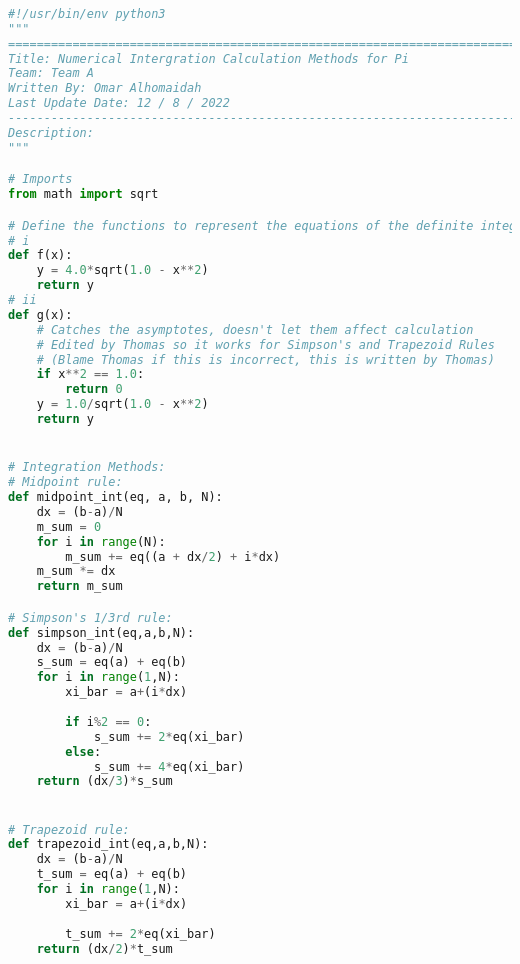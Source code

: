 \documentclass[11pt]{article}
\begin{document}
\begin{lstlisting}[language=Python]
	
#!/usr/bin/env python3
"""
===============================================================================
Title: Numerical Intergration Calculation Methods for Pi
Team: Team A
Written By: Omar Alhomaidah
Last Update Date: 12 / 8 / 2022
-------------------------------------------------------------------------------
Description:
"""

# Imports
from math import sqrt

# Define the functions to represent the equations of the definite integrals
# i
def f(x):
    y = 4.0*sqrt(1.0 - x**2)
    return y
# ii
def g(x):
    # Catches the asymptotes, doesn't let them affect calculation
    # Edited by Thomas so it works for Simpson's and Trapezoid Rules
    # (Blame Thomas if this is incorrect, this is written by Thomas)
    if x**2 == 1.0:
        return 0
    y = 1.0/sqrt(1.0 - x**2)
    return y


# Integration Methods:
# Midpoint rule:
def midpoint_int(eq, a, b, N):
    dx = (b-a)/N
    m_sum = 0
    for i in range(N):
        m_sum += eq((a + dx/2) + i*dx)
    m_sum *= dx
    return m_sum

# Simpson's 1/3rd rule:
def simpson_int(eq,a,b,N):
    dx = (b-a)/N
    s_sum = eq(a) + eq(b)
    for i in range(1,N):
        xi_bar = a+(i*dx)
        
        if i%2 == 0:
            s_sum += 2*eq(xi_bar)
        else:
            s_sum += 4*eq(xi_bar)
    return (dx/3)*s_sum


# Trapezoid rule:
def trapezoid_int(eq,a,b,N):
    dx = (b-a)/N
    t_sum = eq(a) + eq(b)
    for i in range(1,N):
        xi_bar = a+(i*dx)
        
        t_sum += 2*eq(xi_bar)
    return (dx/2)*t_sum
\end{lstlisting}
\end{document}
